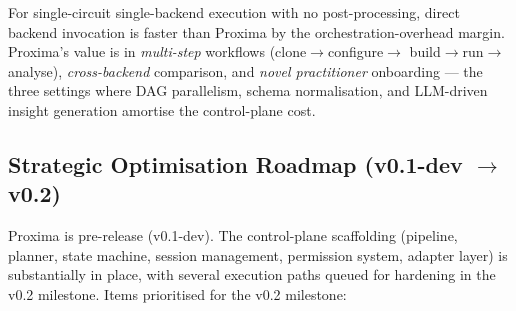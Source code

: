 \documentclass[11pt,a4paper]{article}
\begin{document}
For single-circuit single-backend execution with no post-processing, direct
backend invocation is faster than Proxima by the orchestration-overhead margin.
Proxima's value is in \emph{multi-step} workflows (clone$\to$configure$\to$
build$\to$run$\to$analyse), \emph{cross-backend} comparison, and \emph{novel
practitioner} onboarding --- the three settings where DAG parallelism, schema
normalisation, and LLM-driven insight generation amortise the control-plane
cost.

\subsection{Strategic Optimisation Roadmap (v0.1-dev \(\to\) v0.2)}
\label{sec:proxima-gaps}

Proxima is pre-release (v0.1-dev). The control-plane scaffolding (pipeline,
planner, state machine, session management, permission system, adapter layer) is
substantially in place, with several execution paths queued for hardening in the
v0.2 milestone. Items prioritised for the v0.2 milestone:
\end{document}
